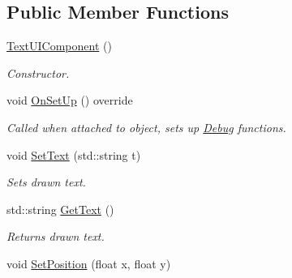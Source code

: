 \subsection*{Public Member Functions}
\begin{DoxyCompactItemize}
\item 
\mbox{\label{class_text_u_i_component_a42895c18da48aeb5f68d5a1494315b62}} 
\mbox{\hyperlink{class_text_u_i_component_a42895c18da48aeb5f68d5a1494315b62}{Text\+U\+I\+Component}} ()
\begin{DoxyCompactList}\small\item\em Constructor. \end{DoxyCompactList}\item 
\mbox{\label{class_text_u_i_component_a44791a353dbe82c4112f9f77fbaa27f2}} 
void \mbox{\hyperlink{class_text_u_i_component_a44791a353dbe82c4112f9f77fbaa27f2}{On\+Set\+Up}} () override
\begin{DoxyCompactList}\small\item\em Called when attached to object, sets up \mbox{\hyperlink{class_debug}{Debug}} functions. \end{DoxyCompactList}\item 
\mbox{\label{class_text_u_i_component_a4fa8c750a70ed097055af9bed210160e}} 
void \mbox{\hyperlink{class_text_u_i_component_a4fa8c750a70ed097055af9bed210160e}{Set\+Text}} (std\+::string t)
\begin{DoxyCompactList}\small\item\em Sets drawn text. \end{DoxyCompactList}\item 
\mbox{\label{class_text_u_i_component_a9374a6f35d7c970fef866c58fdc9d86f}} 
std\+::string \mbox{\hyperlink{class_text_u_i_component_a9374a6f35d7c970fef866c58fdc9d86f}{Get\+Text}} ()
\begin{DoxyCompactList}\small\item\em Returns drawn text. \end{DoxyCompactList}\item 
\mbox{\label{class_text_u_i_component_a6b950479f75950657f2a694b95e637fa}} 
void \mbox{\hyperlink{class_text_u_i_component_a6b950479f75950657f2a694b95e637fa}{Set\+Position}} (float x, float y)

\end{DoxyCompactItemize}
